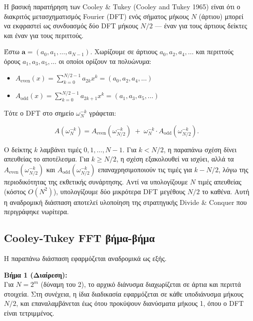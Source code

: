 \documentclass[a4paper, 11pt]{article}
\providecommand{\tightlist}{\setlength{\itemsep}{0pt}\setlength{\parskip}{0pt}}
\begin{document}
Η βασική παρατήρηση των Cooley \& Tukey (Cooley and Tukey 1965) είναι
ότι ο διακριτός μετασχηματισμός Fourier (DFT) ενός σήματος μήκους \(N\)
(άρτιου) μπορεί να εκφραστεί ως συνδυασμός δύο DFT μήκους \(N/2\) ---
έναν για τους άρτιους δείκτες και έναν για τους περιττούς.

Έστω \(\mathbf{a} = (a_0, a_1, \dots, a_{N-1})\). Χωρίζουμε σε άρτιους
\(a_0, a_2, a_4, \dots\) και περιττούς όρους \(a_1, a_3, a_5, \dots\) οι
οποίοι ορίζουν τα πολυώνυμα:

\begin{itemize}
\tightlist
\item
  \(A_{\text{even}}(x) = \sum_{k=0}^{N/2-1} a_{2k} x^k = (a_0, a_2, a_4, \ldots)\)
\item
  \(A_{\text{odd}}(x) = \sum_{k=0}^{N/2-1} a_{2k+1} x^k = (a_1, a_3, a_5, \ldots)\)
\end{itemize}

Τότε ο DFT στο σημείο \(\omega_N^{-k}\) γράφεται:

\[
A(\omega_N^{-k}) = A_{\text{even}}(\omega_{N/2}^{-k}) \;+\; \omega_N^{-k} \cdot A_{\text{odd}}(\omega_{N/2}^{-k}).
\]

Ο δείκτης \(k\) λαμβάνει τιμές \(0, 1, \ldots, N-1\). Για \(k < N/2\), η
παραπάνω σχέση δίνει απευθείας το αποτέλεσμα. Για \(k \ge N/2\), η σχέση
εξακολουθεί να ισχύει, αλλά τα \(A_{\text{even}}(\omega_{N/2}^{-k})\)
και \(A_{\text{odd}}(\omega_{N/2}^{-k})\) επαναχρησιμοποιούν τις τιμές
για \(k - N/2\), λόγω της περιοδικότητας της εκθετικής συνάρτησης. Αντί
να υπολογίζουμε \(N\) τιμές απευθείας (κόστος \(O(N^2)\)), υπολογίζουμε
δύο μικρότερα DFT μεγέθους \(N/2\) το καθένα. Αυτή η αναδρομική διάσπαση
αποτελεί υλοποίηση της στρατηγικής Divide \& Conquer που περιγράφηκε
νωρίτερα.

\subsection{Cooley-Tukey FFT
βήμα-βήμα}\label{cooley-tukey-fft-ux3b2ux3aeux3bcux3b1-ux3b2ux3aeux3bcux3b1}

Η παραπάνω διάσπαση εφαρμόζεται αναδρομικά ως εξής.

\textbf{Βήμα 1 (Διαίρεση):}\\
Για \(N = 2^m\) (δύναμη του 2), το αρχικό διάνυσμα διαχωρίζεται σε άρτια
και περιττά στοιχεία. Στη συνέχεια, η ίδια διαδικασία εφαρμόζεται σε
κάθε υποδιάνυσμα μήκους \(N/2\), και επαναλαμβάνεται έως ότου προκύψουν
διανύσματα μήκους 1, όπου ο DFT είναι τετριμμένος.
\end{document}
